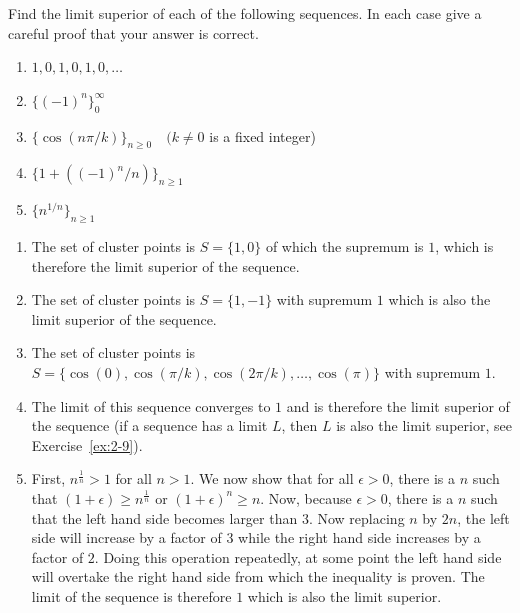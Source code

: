 \begin{exercise}
    Find the limit superior of each of the following sequences. In each case give a careful proof that your answer is correct.
    \begin{enumerate}[label=(\alph*)]
        \item $1,0,1,0,1,0,\ldots$
        \item $\{(-1)^n\}_0^\infty$
        \item $\{\cos(n\pi/k)\}_{n\geq0} \quad (k \neq 0$ is a fixed integer)
        \item $\{1 + ((-1)^n/n)\}_{n\geq 1}$
        \item $\{n^{1/n}\}_{n\geq1}$
    \end{enumerate}
\end{exercise}
\begin{solution}
    \begin{enumerate}[label=(\alph*)]
        \item The set of cluster points is $S = \{1, 0\}$ of which the supremum is $1$, which is therefore the limit superior of the sequence.
        \item The set of cluster points is $S= \{1, -1\}$ with supremum $1$ which is also the limit superior of the sequence.
        \item The set of cluster points is $S = \{\cos(0), \cos(\pi/k), \cos(2\pi/k), \ldots, \cos(\pi)\}$ with supremum $1$.
        \item The limit of this sequence converges to $1$ and is therefore the limit superior of the sequence (if a sequence has a limit $L$, then $L$ is also the limit superior, see Exercise~\ref{ex:2-9}).
        \item First, $n^{\frac1n} > 1$ for all $n>1$. We now show that for all $\epsilon > 0$, there is a $n$ such that $(1+\epsilon) \geq n^{\frac{1}{n}}$ or $(1+\epsilon)^n \geq n$. Now, because $\epsilon > 0$, there is a $n$ such that the left hand side becomes larger than $3$. Now replacing $n$ by $2n$, the left side will increase by a factor of $3$ while the right hand side increases by a factor of $2$. Doing this operation repeatedly, at some point the left hand side will overtake the right hand side from which the inequality is proven. The limit of the sequence is therefore $1$ which is also the limit superior.
    \end{enumerate}
\end{solution}

